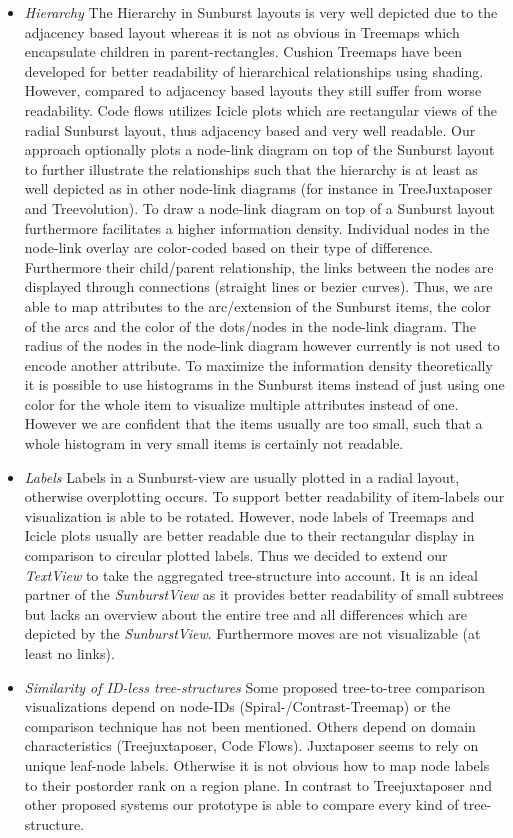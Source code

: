 \begin{itemize}
\item \emph{Hierarchy} The Hierarchy in Sunburst layouts is very well depicted due to the adjacency based layout whereas it is not as obvious in Treemaps which encapsulate children in parent-rectangles. Cushion Treemaps have been developed for better readability of hierarchical relationships using shading. However, compared to adjacency based layouts they still suffer from worse readability. Code flows utilizes Icicle plots which are rectangular views of the radial Sunburst layout, thus adjacency based and very well readable. Our approach optionally plots a node-link diagram on top of the Sunburst layout to further illustrate the relationships such that the hierarchy is at least as well depicted as in other node-link diagrams (for instance in TreeJuxtaposer and Treevolution). To draw a node-link diagram on top of a Sunburst layout furthermore facilitates a higher information density. Individual nodes in the node-link overlay are color-coded based on their type of difference. Furthermore their child/parent relationship, the links between the nodes are displayed through connections (straight lines or bezier curves). Thus, we are able to map attributes to the arc/extension of the Sunburst items, the color of the arcs and the color of the dots/nodes in the node-link diagram. The radius of the nodes in the node-link diagram however currently is not used to encode another attribute. To maximize the information density theoretically it is possible to use histograms in the Sunburst items instead of just using one color for the whole item to visualize multiple attributes instead of one. However we are confident that the items usually are too small, such that a whole histogram in very small items is certainly not readable. 
\item \emph{Labels} Labels in a Sunburst-view are usually plotted in a radial layout, otherwise overplotting occurs. To support better readability of item-labels our visualization is able to be rotated. However, node labels of Treemaps and Icicle plots usually are better readable due to their rectangular display in comparison to circular plotted labels. Thus we decided to extend our \emph{TextView} to take the aggregated tree-structure into account. It is an ideal partner of the \emph{SunburstView} as it provides better readability of small subtrees but lacks an overview about the entire tree and all differences which are depicted by the \emph{SunburstView}. Furthermore moves are not visualizable (at least no links).
\item \emph{Similarity of ID-less tree-structures} Some proposed tree-to-tree comparison visualizations depend on node-IDs (Spiral-/Contrast-Treemap\cite{tu2007visualizing}) or the comparison technique has not been mentioned. Others depend on domain characteristics (Treejuxtaposer\cite{munzner2003treejuxtaposer}, Code Flows\cite{telea2008code}). Juxtaposer seems to rely on unique leaf-node labels. Otherwise it is not obvious how to map node labels to their postorder rank on a region plane. In contrast to Treejuxtaposer and other proposed systems our prototype is able to compare every kind of tree-structure.

\end{itemize}
